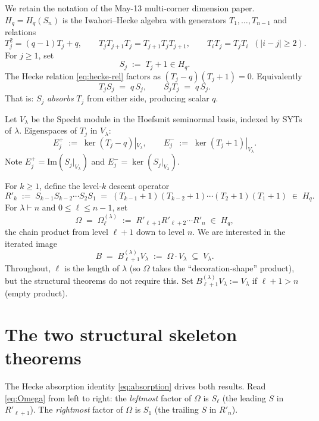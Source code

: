 \documentclass[11pt]{article}
\theoremstyle{definition}
\newcommand{\Hq}{H_q}
\newcommand{\Sn}{S_n}
\newcommand{\Bdec}{B_{\ell+1}^{(\lambda)}}
\newcommand{\Om}{\Omega}
\begin{document}
We retain the notation of the May-13 multi-corner dimension paper.
$\Hq = \Hq(\Sn)$ is the Iwahori--Hecke algebra with generators
$T_1, \ldots, T_{n-1}$ and relations
\begin{equation}\label{eq:hecke-rel}
   T_j^2 = (q-1) T_j + q, \qquad
   T_j T_{j+1} T_j = T_{j+1} T_j T_{j+1}, \qquad
   T_i T_j = T_j T_i \;\;(|i-j| \ge 2).
\end{equation}
For $j \ge 1$, set
\begin{equation}\label{eq:Sj}
   S_j \;:=\; T_j + 1 \in \Hq.
\end{equation}
The Hecke relation
\eqref{eq:hecke-rel} factors as $(T_j - q)(T_j+1) = 0$. Equivalently
\begin{equation}\label{eq:absorption}
   T_j S_j \;=\; q\, S_j, \qquad S_j T_j \;=\; q\, S_j.
\end{equation}
That is: $S_j$ \emph{absorbs} $T_j$ from either side, producing
scalar $q$.

Let $V_\lambda$ be the Specht module in the Hoefsmit seminormal basis,
indexed by SYTs of $\lambda$. Eigenspaces of $T_j$ in $V_\lambda$:
\[
   E_j^+ \;:=\; \ker(T_j - q)|_{V_\lambda}, \qquad
   E_j^- \;:=\; \ker(T_j + 1)|_{V_\lambda}.
\]
Note $E_j^+ = \mathrm{Im}(S_j|_{V_\lambda})$ and
$E_j^- = \ker(S_j|_{V_\lambda})$.

For $k \ge 1$, define the level-$k$ descent operator
\[
   R'_k \;:=\; S_{k-1} S_{k-2} \cdots S_2 S_1 \;=\;
   (T_{k-1}+1)(T_{k-2}+1)\cdots(T_2+1)(T_1+1) \;\in\; \Hq.
\]
For $\lambda \vdash n$ and $0 \le \ell \le n-1$, set
\begin{equation}\label{eq:Omega}
   \Om \;=\; \Om^{(\lambda)}_\ell \;:=\;
   R'_{\ell+1} R'_{\ell+2} \cdots R'_n \;\in\; \Hq,
\end{equation}
the chain product from level $\ell+1$ down to level $n$. We are
interested in the iterated image
\[
   B \;=\; \Bdec V_\lambda \;:=\; \Om \cdot V_\lambda \;\subseteq\; V_\lambda.
\]
Throughout, $\ell$ is the length of $\lambda$ (so $\Om$ takes the
``decoration-shape'' product), but the structural theorems do not require
this. Set $\Bdec V_\lambda := V_\lambda$ if $\ell+1 > n$ (empty product).

\section{The two structural skeleton theorems}\label{sec:two-theorems}

The Hecke absorption identity \eqref{eq:absorption} drives both results.
Read \eqref{eq:Omega} from left to right: the \emph{leftmost} factor of
$\Om$ is $S_\ell$ (the leading $S$ in $R'_{\ell+1}$). The \emph{rightmost}
factor of $\Om$ is $S_1$ (the trailing $S$ in $R'_n$).
\end{document}
